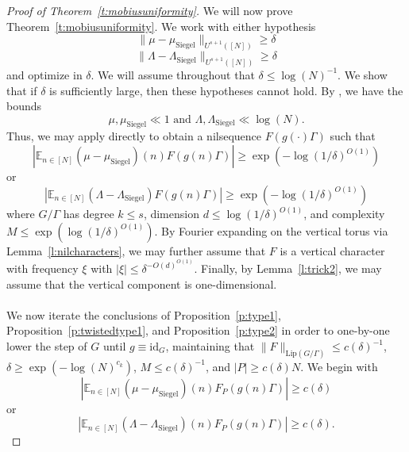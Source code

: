 \documentclass[11pt, a4paper]{amsart}
\theoremstyle{plain}
\theoremstyle{plain}
\theoremstyle{definition}
\theoremstyle{remark}
\numberwithin{equation}{section}
\numberwithin{lemma}{section}
\numberwithin{proposition}{section}
\numberwithin{corollary}{section}
\numberwithin{definition}{section}
\numberwithin{claim}{section}
\begin{document}
\begin{proof}[Proof of Theorem~\ref{t:mobiusuniformity}]
We will now prove Theorem~\ref{t:mobiusuniformity}. We work with either hypothesis
$$\|\mu - \mu_{\mathrm{Siegel}}\|_{U^{s + 1}([N])} \ge \delta$$
$$\|\Lambda - \Lambda_{\mathrm{Siegel}}\|_{U^{s + 1}([N])} \ge \delta$$
and optimize in $\delta$. We will assume throughout that $\delta \le \log(N)^{-1}$. We show that if $\delta$ is sufficiently large, then these hypotheses cannot hold. By \cite[Lemma 2.4]{TT21}, we have the bounds
$$\mu, \mu_{\mathrm{Siegel}} \ll 1 \text{ and } \Lambda, \Lambda_{\mathrm{Siegel}} \ll \log(N).$$
Thus, we may apply \cite[Theorem 1.2]{LSS24b} directly to obtain a nilsequence $F(g(\cdot)\Gamma)$ such that
\begin{equation}\label{e:beginningmobius}
|\mathbb{E}_{n \in [N]} (\mu - \mu_{\mathrm{Siegel}})(n) F(g(n)\Gamma) | \ge \exp(-\log(1/\delta)^{O(1)})   
\end{equation}
or 
\begin{equation}\label{e:beginningvonmango}
|\mathbb{E}_{n \in [N]} (\Lambda - \Lambda_{\mathrm{Siegel}})F(g(n)\Gamma)| \ge \exp(-\log(1/\delta)^{O(1)})    
\end{equation}
where $G/\Gamma$ has degree $k \le s$, dimension $d \le \log(1/\delta)^{O(1)}$, and complexity $M \le \exp(\log(1/\delta)^{O(1)})$. By Fourier expanding on the vertical torus via Lemma~\ref{l:nilcharacters}, we may further assume that $F$ is a vertical character with frequency $\xi$ with $|\xi| \le \delta^{-O(d)^{O(1)}}$. Finally, by Lemma~\ref{l:trick2}, we may assume that the vertical component is one-dimensional. \\\\
We now iterate the conclusions of Proposition~\ref{p:type1}, Proposition~\ref{p:twistedtype1}, and Proposition~\ref{p:type2} in order to one-by-one lower the step of $G$ until $g \equiv \mathrm{id}_G$, maintaining that $\|F\|_{\mathrm{Lip}(G/\Gamma)} \le c(\delta)^{-1}$, $\delta \ge \exp(-\log(N)^{c_k})$, $M \le c(\delta)^{-1}$, and $|P| \ge c(\delta)N$. We begin with 
\begin{equation} \label{e:beginningprogressionmobius}
|\mathbb{E}_{n \in [N]} (\mu - \mu_{\mathrm{Siegel}})(n) F_P(g(n)\Gamma)| \ge c(\delta)
\end{equation}
or
\begin{equation}\label{e:beginningprogressionvonmango}
|\mathbb{E}_{n \in [N]} (\Lambda - \Lambda_{\mathrm{Siegel}})(n) F_P(g(n)\Gamma)| \ge c(\delta).
\end{equation}

\end{proof}
\end{document}
